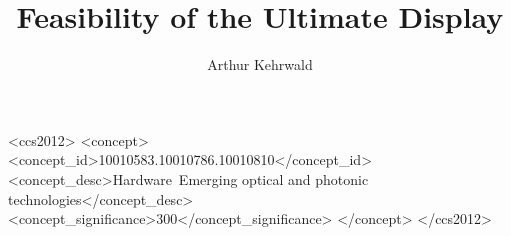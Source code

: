 \documentclass[sigplan,screen]{acmart}
\begin{document}
\title{Feasibility of the Ultimate Display}

\author{Arthur Kehrwald}

\begin{abstract}
  
\end{abstract}

\begin{CCSXML}
<ccs2012>
   <concept>
       <concept_id>10010583.10010786.10010810</concept_id>
       <concept_desc>Hardware~Emerging optical and photonic technologies</concept_desc>
       <concept_significance>300</concept_significance>
       </concept>
 </ccs2012>
\end{CCSXML}




\maketitle













\end{document}
